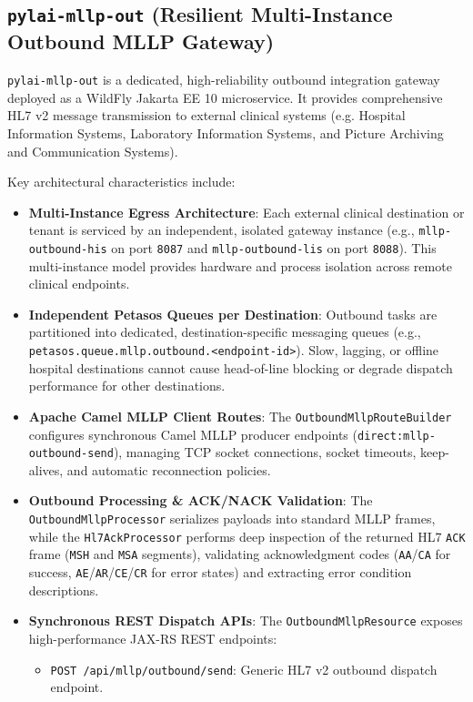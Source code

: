 \subsection{\texttt{pylai-mllp-out} (Resilient Multi-Instance Outbound MLLP Gateway)}
\texttt{pylai-mllp-out} is a dedicated, high-reliability outbound integration gateway deployed as a WildFly Jakarta EE 10 microservice. It provides comprehensive HL7 v2 message transmission to external clinical systems (e.g. Hospital Information Systems, Laboratory Information Systems, and Picture Archiving and Communication Systems).

Key architectural characteristics include:
\begin{itemize}
    \item \textbf{Multi-Instance Egress Architecture}: Each external clinical destination or tenant is serviced by an independent, isolated gateway instance (e.g., \texttt{mllp-outbound-his} on port \texttt{8087} and \texttt{mllp-outbound-lis} on port \texttt{8088}). This multi-instance model provides hardware and process isolation across remote clinical endpoints.
    \item \textbf{Independent Petasos Queues per Destination}: Outbound tasks are partitioned into dedicated, destination-specific messaging queues (e.g., \texttt{petasos.queue.mllp.outbound.<endpoint-id>}). Slow, lagging, or offline hospital destinations cannot cause head-of-line blocking or degrade dispatch performance for other destinations.
    \item \textbf{Apache Camel MLLP Client Routes}: The \texttt{OutboundMllpRouteBuilder} configures synchronous Camel MLLP producer endpoints (\texttt{direct:mllp-outbound-send}), managing TCP socket connections, socket timeouts, keep-alives, and automatic reconnection policies.
    \item \textbf{Outbound Processing \& ACK/NACK Validation}: The \texttt{OutboundMllpProcessor} serializes payloads into standard MLLP frames, while the \texttt{Hl7AckProcessor} performs deep inspection of the returned HL7 \texttt{ACK} frame (\texttt{MSH} and \texttt{MSA} segments), validating acknowledgment codes (\texttt{AA}/\texttt{CA} for success, \texttt{AE}/\texttt{AR}/\texttt{CE}/\texttt{CR} for error states) and extracting error condition descriptions.
    \item \textbf{Synchronous REST Dispatch APIs}: The \texttt{OutboundMllpResource} exposes high-performance JAX-RS REST endpoints:
    \begin{itemize}
        \item \texttt{POST /api/mllp/outbound/send}: Generic HL7 v2 outbound dispatch endpoint.

\end{itemize}
\end{itemize}
